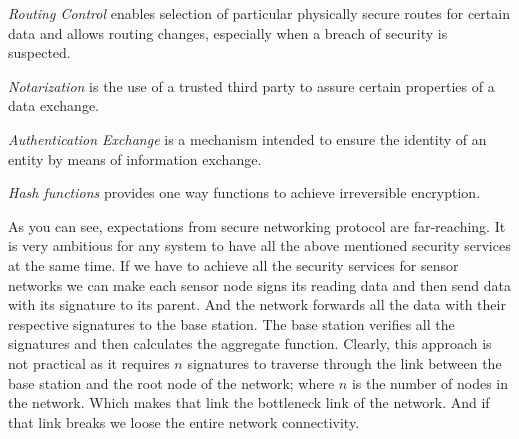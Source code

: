 		\textit{Routing Control} enables selection of particular physically secure routes for certain data and allows routing changes, especially when a breach of security is suspected.

		\textit{Notarization} is the use of a trusted third party to assure certain properties of a data exchange.

		\textit{Authentication Exchange} is a mechanism intended to ensure the identity of an entity by means of information exchange.

		\textit{Hash functions} provides one way functions to achieve irreversible encryption.

	As you can see, expectations from secure networking protocol are far-reaching.
	It is very ambitious for any system to have all the above mentioned security services at the same time.
	If we have to achieve all the security services for sensor networks we can make each sensor node signs its reading data and then send data with its signature to its parent.
	And the network forwards all the data with their respective signatures to the base station.
	The base station verifies all the signatures and then calculates the aggregate function.
	Clearly, this approach is not practical as it requires $n$ signatures to traverse through the link between the base station and the root node of the network; where $n$ is the number of nodes in the network.
	Which makes that link the bottleneck link of the network. 
	And if that link breaks we loose the entire network connectivity.

